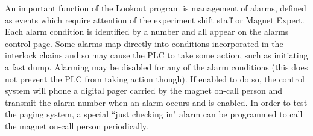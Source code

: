 {An important function of the Lookout program is management of alarms, defined as events which require attention 
of the experiment shift staff or Magnet Expert.  Each alarm condition is identified by a number and all appear 
on the alarms control page.  Some alarms map directly into conditions incorporated in the interlock chains 
and so may cause the PLC to take some action, such as initiating a fast dump.  Alarming may be disabled for any 
of the alarm conditions (this does not prevent the PLC from taking action though).  If enabled to do so, the 
control system will phone a digital pager carried by the magnet on-call person and transmit the alarm number 
when an alarm occurs and is enabled.  In order to test the paging system, a special ``just checking in" alarm 
can be programmed to call the magnet on-call person periodically.

} %


